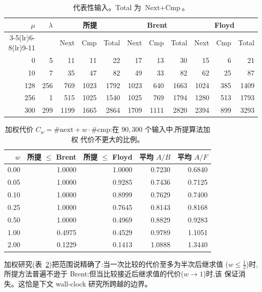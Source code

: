 \documentclass[11pt]{ctexart}
\begin{document}
\begin{table}[H]\centering
\caption{代表性输入。Total 为 $\text{Next}+\text{Cmp}$。}
\label{tab:examples}
\begin{tabular}{rrrrrrrrrrr}
\toprule
$\mu$ & $\lambda$ & \multicolumn{3}{c}{所提} & \multicolumn{3}{c}{Brent} & \multicolumn{3}{c}{Floyd} \\
\cmidrule(lr){3-5}\cmidrule(lr){6-8}\cmidrule(lr){9-11}
 & & Next & Cmp & Total & Next & Cmp & Total & Next & Cmp & Total \\
\midrule
0 & 5 & 11 & 11 & 22 & 17 & 13 & 30 & 15 & 6 & 21 \\
10 & 7 & 35 & 47 & 82 & 49 & 33 & 82 & 62 & 25 & 87 \\
128 & 256 & 769 & 1023 & 1792 & 1023 & 640 & 1663 & 1024 & 385 & 1409 \\
256 & 1 & 515 & 1025 & 1540 & 1025 & 769 & 1794 & 1280 & 513 & 1793 \\
300 & 299 & 1199 & 1665 & 2864 & 1709 & 1111 & 2820 & 2394 & 899 & 3293 \\
\bottomrule
\end{tabular}
\end{table}

\begin{table}[H]\centering
\caption{加权代价 $C_w=\#\text{next}+w\cdot\#\text{cmp}$:在 $90{,}300$ 个输入中,所提算法加权
代价不更大的比例。}
\label{tab:weighted}
\begin{tabular}{rrrrr}
\toprule
$w$ & 所提 $\le$ Brent & 所提 $\le$ Floyd & 平均 $A/B$ & 平均 $A/F$ \\
\midrule
0.00 & 1.0000 & 1.0000 & 0.7230 & 0.6840 \\
0.05 & 1.0000 & 0.9285 & 0.7436 & 0.7125 \\
0.10 & 1.0000 & 0.8999 & 0.7629 & 0.7400 \\
0.25 & 1.0000 & 0.7645 & 0.8143 & 0.8168 \\
0.50 & 1.0000 & 0.4969 & 0.8829 & 0.9283 \\
1.00 & 0.4975 & 0.4529 & 0.9789 & 1.1051 \\
2.00 & 0.1229 & 0.1413 & 1.0888 & 1.3440 \\
\bottomrule
\end{tabular}
\end{table}

加权研究(表~\ref{tab:weighted})把范围说精确了:当一次比较的代价至多为半次后继求值
($w\le\tfrac12$)时,所提方法普遍不逊于 Brent;但当比较接近后继求值的代价($w\to1$)时,该
保证消失。这恰是下文 wall-clock 研究所跨越的边界。
\end{document}
